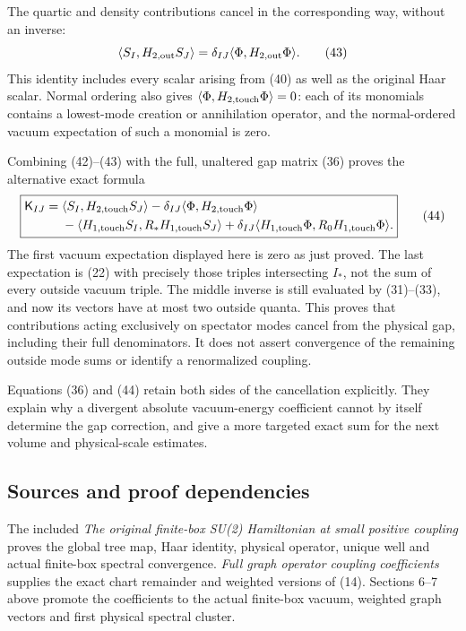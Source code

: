 \documentclass[
  11pt,
]{article}
\begin{document}
The quartic and density contributions cancel in the corresponding way,
without an inverse: \[
 \langle S_I,H_{2,\rm out}S_J\rangle
       =\delta_{IJ}\langle\Phi,H_{2,\rm out}\Phi\rangle .
 \tag{43}
\] This identity includes every scalar arising from (40) as well as the
original Haar scalar. Normal ordering also gives
\(\langle\Phi,H_{2,\rm touch}\Phi\rangle=0\): each of its monomials
contains a lowest-mode creation or annihilation operator, and the
normal-ordered vacuum expectation of such a monomial is zero.

Combining (42)--(43) with the full, unaltered gap matrix (36) proves the
alternative exact formula \[
 \boxed{\begin{split}
 \mathsf K_{IJ}={}&
  \langle S_I,H_{2,\rm touch}S_J\rangle
       -\delta_{IJ}\langle\Phi,H_{2,\rm touch}\Phi\rangle\\
 &-\langle H_{1,\rm touch}S_I,R_*H_{1,\rm touch}S_J\rangle
       +\delta_{IJ}\langle H_{1,\rm touch}\Phi,
                                      R_0H_{1,\rm touch}\Phi\rangle .
 \end{split}}
 \tag{44}
\] The first vacuum expectation displayed here is zero as just proved.
The last expectation is (22) with precisely those triples intersecting
\(I_*\), not the sum of every outside vacuum triple. The middle inverse
is still evaluated by (31)--(33), and now its vectors have at most two
outside quanta. This proves that contributions acting exclusively on
spectator modes cancel from the physical gap, including their full
denominators. It does not assert convergence of the remaining outside
mode sums or identify a renormalized coupling.

Equations (36) and (44) retain both sides of the cancellation
explicitly. They explain why a divergent absolute vacuum-energy
coefficient cannot by itself determine the gap correction, and give a
more targeted exact sum for the next volume and physical-scale
estimates.

\subsection{Sources and proof
dependencies}\label{weak-coupling-part-15-sources-and-proof-dependencies}

The included \emph{The original finite-box SU(2) Hamiltonian at small
positive coupling} proves the global tree map, Haar identity, physical
operator, unique well and actual finite-box spectral convergence.
\emph{Full graph operator coupling coefficients} supplies the exact
chart remainder and weighted versions of (14). Sections 6--7 above
promote the coefficients to the actual finite-box vacuum, weighted graph
vectors and first physical spectral cluster.
\end{document}
